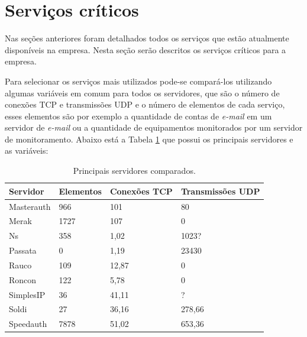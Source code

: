 \section{Serviços críticos}
\label{section:servcrit}

Nas seções anteriores foram detalhados todos os serviços que estão atualmente disponíveis na empresa. Nesta seção serão descritos os serviços 
críticos para a empresa. 

Para selecionar os serviços mais utilizados pode-se compará-los utilizando algumas variáveis em comum para todos os servidores, que são o número 
de conexões \ac{TCP} e transmissões \ac{UDP} e o número de elementos de cada serviço, esses elementos são por exemplo a quantidade de 
contas de \textit{e-mail} em um servidor de \textit{e-mail} ou a quantidade de equipamentos monitorados por um servidor de monitoramento. 
Abaixo está a Tabela \ref{tab:servicoscompara} que possui os principais servidores e as variáveis:

\begin{table}[h!]
\caption{Principais servidores comparados.}
\label{tab:servicoscompara}
\begin{center}
\begin{tabular}{|p{2cm}|l|l|l|}\hline
Servidor & Elementos & Conexões TCP & Transmissões UDP\\\hline
Masterauth & 966 & 101 & 80\\\hline
Merak & 1727 & 107 & 0\\\hline
Ns & 358 & 1,02 & 1023?\\\hline
Passata & 0 & 1,19 & 23430\\\hline
Rauco & 109 & 12,87 & 0\\\hline
Roncon & 122 & 5,78 & 0\\\hline
SimplesIP & 36 & 41,11 & ?\\\hline
Soldi & 27 & 36,16 & 278,66\\\hline
Speedauth & 7878 & 51,02 & 653,36\\\hline
\end{tabular}
\end{center}
\end{table}

